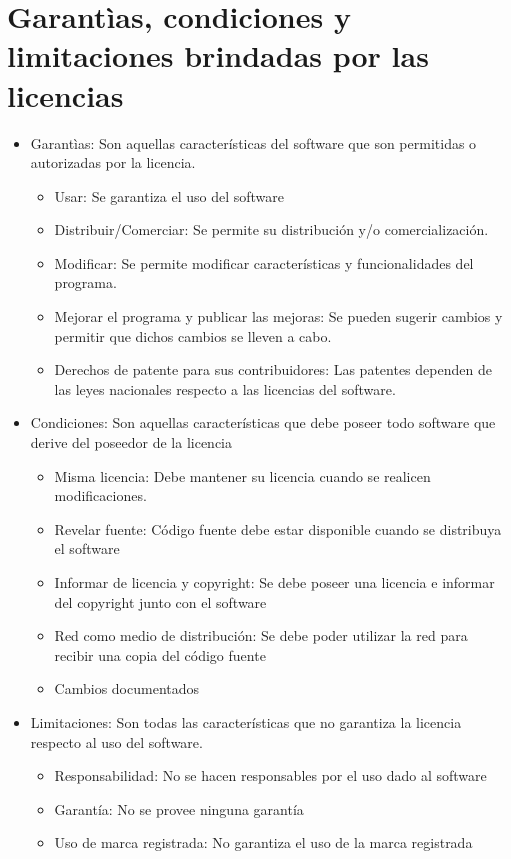 \section{Garantìas, condiciones y limitaciones brindadas por las licencias}
\begin{itemize}
\item Garantìas: Son aquellas características del software que son permitidas o autorizadas por la licencia.
\begin{itemize}
\item Usar: Se garantiza el uso del software
\item Distribuir/Comerciar: Se permite su distribución y/o comercialización.
\item Modificar: Se permite modificar características y funcionalidades del programa.
\item Mejorar el programa y publicar las mejoras: Se pueden sugerir cambios y permitir que dichos cambios se lleven a cabo.
\item Derechos de patente para sus contribuidores: Las patentes dependen de las leyes nacionales respecto a las licencias del software.
\end{itemize}
\item Condiciones: Son aquellas características que debe poseer todo software que derive del poseedor de la licencia
\begin{itemize}
\item Misma licencia: Debe mantener su licencia cuando se realicen modificaciones.
\item Revelar fuente: Código fuente debe estar disponible cuando se distribuya el software
\item Informar de licencia y copyright: Se debe poseer una licencia e informar del copyright junto con el software
\item Red como medio de distribución: Se debe poder utilizar la red para recibir una copia del código fuente
\item Cambios documentados
\end{itemize}
\item Limitaciones: Son todas las características que no garantiza la licencia respecto al uso del software.
\begin{itemize}
\item Responsabilidad: No se hacen responsables por el uso dado al software
\item Garantía: No se provee ninguna garantía
\item Uso de marca registrada: No garantiza el uso de la marca registrada
\end{itemize}
\end{itemize}

